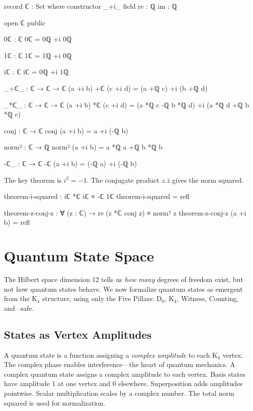 \documentclass[11pt,a4paper]{book}
\def\cdot{.}%
\def\texttt#1{#1}%
\begin{document}
\begin{code}
record ℂ : Set where
  constructor _+i_
  field
    re : ℚ
    im : ℚ

open ℂ public

0ℂ : ℂ
0ℂ = 0ℚ +i 0ℚ

1ℂ : ℂ
1ℂ = 1ℚ +i 0ℚ

iℂ : ℂ
iℂ = 0ℚ +i 1ℚ

_+ℂ_ : ℂ → ℂ → ℂ
(a +i b) +ℂ (c +i d) = (a +ℚ c) +i (b +ℚ d)

_*ℂ_ : ℂ → ℂ → ℂ
(a +i b) *ℂ (c +i d) = (a *ℚ c -ℚ b *ℚ d) +i (a *ℚ d +ℚ b *ℚ c)

conj : ℂ → ℂ
conj (a +i b) = a +i (-ℚ b)

norm² : ℂ → ℚ
norm² (a +i b) = a *ℚ a +ℚ b *ℚ b

-ℂ_ : ℂ → ℂ
-ℂ (a +i b) = (-ℚ a) +i (-ℚ b)
\end{code}

The key theorem is $i^2 = -1$. The conjugate product $z \cdot \bar{z}$ gives the norm squared.

\begin{code}
theorem-i-squared : iℂ *ℂ iℂ ≡ -ℂ 1ℂ
theorem-i-squared = refl

theorem-z-conj-z : ∀ (z : ℂ) → re (z *ℂ conj z) ≡ norm² z
theorem-z-conj-z (a +i b) = refl
\end{code}

\section{Quantum State Space}

The Hilbert space dimension 12 tells us \emph{how many} degrees of freedom exist,
but not how quantum states behave. We now formalize quantum states as emergent
from the K$_4$ structure, using only the Five Pillars: D$_0$, K$_4$, Witness, 
Counting, and \texttt{--safe}.

\subsection{States as Vertex Amplitudes}

A quantum state is a function assigning a \emph{complex amplitude} to each K$_4$ vertex.
The complex phase enables interference—the heart of quantum mechanics. A complex quantum state assigns a complex amplitude to each vertex. Basis states have amplitude 1 at one vertex and 0 elsewhere. Superposition adds amplitudes pointwise. Scalar multiplication scales by a complex number. The total norm squared is used for normalization.
\end{document}
